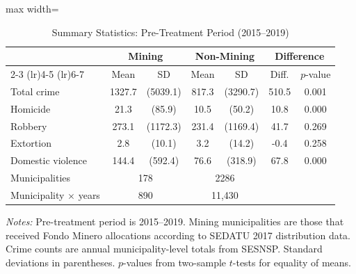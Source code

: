 \begin{table}[H]
\centering
\caption{Summary Statistics: Pre-Treatment Period (2015--2019)}
\label{tab:sumstats}
\begin{adjustbox}{max width=\textwidth}
\begin{threeparttable}
\begin{tabular}{l cc cc cc}
\toprule
 & \multicolumn{2}{c}{Mining} & \multicolumn{2}{c}{Non-Mining} & \multicolumn{2}{c}{Difference} \\
\cmidrule(lr){2-3} \cmidrule(lr){4-5} \cmidrule(lr){6-7}
 & Mean & SD & Mean & SD & Diff. & $p$-value \\
\midrule
Total crime & 1327.7 & (5039.1) & 817.3 & (3290.7) & 510.5 & 0.001 \\
Homicide & 21.3 & (85.9) & 10.5 & (50.2) & 10.8 & 0.000 \\
Robbery & 273.1 & (1172.3) & 231.4 & (1169.4) & 41.7 & 0.269 \\
Extortion & 2.8 & (10.1) & 3.2 & (14.2) & -0.4 & 0.258 \\
Domestic violence & 144.4 & (592.4) & 76.6 & (318.9) & 67.8 & 0.000 \\
\midrule
Municipalities & \multicolumn{2}{c}{178} & \multicolumn{2}{c}{2286} & & \\
Municipality $\times$ years & \multicolumn{2}{c}{890} & \multicolumn{2}{c}{11,430} & & \\
\bottomrule
\end{tabular}
\begin{tablenotes}[flushleft]\footnotesize
\item \textit{Notes:} Pre-treatment period is 2015--2019. Mining municipalities are those that received Fondo Minero allocations according to SEDATU 2017 distribution data. Crime counts are annual municipality-level totals from SESNSP. Standard deviations in parentheses. $p$-values from two-sample $t$-tests for equality of means.
\end{tablenotes}
\end{threeparttable}
\end{adjustbox}
\end{table}


